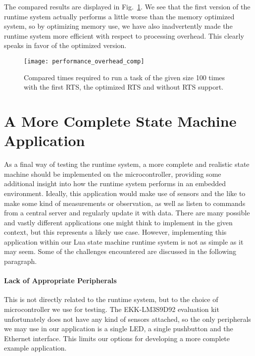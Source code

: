 The compared results are displayed in Fig.~\ref{fig:performance_overhead_comp}. We see that the first version of the runtime system actually performs a little worse than the memory optimized system, so by optimizing memory use, we have also inadvertently made the runtime system more efficient with respect to processing overhead. This clearly speaks in favor of the optimized version.

\begin{figure}[htp]
	\centering
	\texttt{[image: performance\_overhead\_comp]}
	\caption[Results of performance comparison with the first version of the RTS]{Compared times required to run a task of the given size 100 times with the first RTS, the optimized RTS and without RTS support.}
	\label{fig:performance_overhead_comp}
\end{figure}

\FloatBarrier
\section{A More Complete State Machine Application}
\label{sec:complete_app}
As a final way of testing the runtime system, a more complete and realistic state machine should be implemented on the microcontroller, providing some additional insight into how the runtime system performs in an embedded environment. Ideally, this application would make use of sensors and the like to make some kind of measurements or observation, as well as listen to commands from a central server and regularly update it with data. There are many possible and vastly different applications one might think to implement in the given context, but this represents a likely use case. However, implementing this application within our Lua state machine runtime system is not as simple as it may seem. Some of the challenges encountered are discussed in the following paragraph.

\paragraph{Lack of Appropriate Peripherals} This is not directly related to the runtime system, but to the choice of microcontroller we use for testing. The EKK-LM3S9D92 evaluation kit unfortunately does not have any kind of sensors attached, so the only peripherals we may use in our application is a single LED, a single pushbutton and the Ethernet interface. This limits our options for developing a more complete example application.

